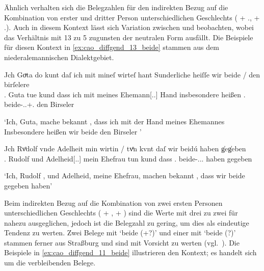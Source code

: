 Ähnlich verhalten sich die Belegzahlen für den indirekten Bezug auf die
Kombination von erster und dritter Person unterschiedlichen Geschlechts
(\Fsg\subM{} + \Tsg.\FemF, \Fsg\subF{} + \Tsg.\MascM). Auch in diesem
Kontext lässt sich Variation zwischen  und 
beobachten, wobei das Verhältnis mit 13 zu 5 zugunsten der neutralen Form
ausfällt. Die Beispiele für diesen Kontext in \cref{ex:cao_diffgend_13_beide}
stammen aus
dem niederalemannischen Dialektgebiet.

\begin{exe}
\ex \label{ex:cao_diffgend_13_beide}
	\begin{xlist}
	\ex \label{ex:cao_diffgend_13_beide_1}
		\gll Jch Goͮta \textelp{} do kunt \textelp{} daſ ich mit mineſ
			wirteſ hant \textelp{} Sunderliche heiſſe wir
			beide / den birſelere~\scalebox{.9}{\textelp{}} \\
			\Fsg\subF.\Nom{} Guta {} tue kund {} dass ich mit meines
			Ehemann[\Gen.\Sg.\MascM] Hand {} insbesondere heißen
			\Fpl\subMF.\Nom{} beide-\Nom.\Pl.\M+\F\subMF.\St{} {} den
			Birseler~{} \\
		\begin{taggedline}{\parencites(Basel, 1273)[\pno~199, 210.21--28]{cao1}}
		\trans `Ich, Guta, \textelp{} mache bekannt \textelp{}, dass ich
			mit der Hand meines Ehemannes \textelp{} Insbesondere heißen wir
			beide den Birseler \textelp{}'
		\end{taggedline}

	\ex \label{ex:cao_diffgend_13_beide_2}
		\gll Jch Rvͦdolf \textelp{} vnde Adelheit min wirtin / tvͤn
			kvnt \textelp{} daſ wir beidú \textelp{} haben
			g̍eg̍eben \textelp{} \\
			\Fsg\subM.\Nom{} Rudolf {} und Adelheid[\Nom.\Sg.\FemF] mein
			Ehefrau {} tun kund {} dass \Fpl\subMF.\Nom{}
			beide-\Nom.\Pl.\NeutMF.\St{} {} haben gegeben {}\\
		\begin{taggedline}{\parencites(Guebwiller, Dépt.~Haut-Rhin, 1289)[\pno~1154, 432.5--11]{cao2}}
		\trans `Ich, Rudolf \textelp{}, und Adelheid, meine Ehefrau,
			machen bekannt \textelp{}, dass wir beide \textelp{} gegeben haben'
		\end{taggedline}
	\end{xlist}
\end{exe}

Beim indirekten Bezug auf die Kombination von zwei ersten Personen
unterschiedlichen Geschlechts (\Fsg\subM{} + \Fsg\subF, \Fsg\subF{} +
\Fsg\subM) sind die Werte mit drei zu zwei für  nahezu ausgeglichen,
jedoch ist die Belegzahl zu gering, um dies als eindeutige Tendenz zu werten.
Zwei Belege mit  `beide (\M+\F?)' und einer mit 
`beide (\N?)' stammen ferner aus Straßburg und sind mit Vorsicht zu werten
(vgl.~). Die Beispiele in
\cref{ex:cao_diffgend_11_beide} %
illustrieren den Kontext; es handelt sich um die verbleibenden Belege.

